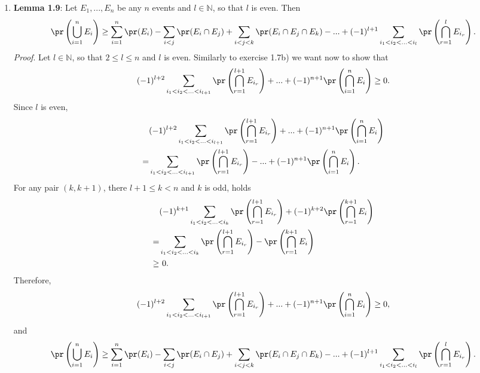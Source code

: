 \begin{enumerate}
  \item[(c)] \textbf{Lemma 1.9}: Let $E_1,...,E_n$ be any $n$ events and $l \in
  \mathbb{N}$, so that $l$ is even. Then
  \[
    \pr\left(\bigcup_{i=1}^n E_i\right)
    \geq \sum_{i=1}^n \pr(E_i) - \sum_{i<j}\pr(E_i \cap E_j) + \sum_{i<j<k}\pr(E_i \cap E_j \cap E_k) - ... + (-1)^{l+1} \sum_{i_1<i_2< ... <i_l} \pr\left(\bigcap_{r=1}^lE_{i_r}\right).
  \]
  \textit{Proof}. Let $l \in \mathbb{N}$, so that $2 \leq l \leq n$ and $l$ is even. Similarly to exercise 1.7b) we want now to show that
  \[
    (-1)^{l+2} \sum_{i_1<i_2< ... <i_{l+1}} \pr\left(\bigcap_{r=1}^{l+1} E_{i_r}\right)
    + ... + (-1)^{n+1} \pr\left(\bigcap_{i=1}^n E_{i}\right) \geq 0.
  \]
  Since $l$ is even,
  \begin{align*}
      &(-1)^{l+2} \sum_{i_1<i_2< ... <i_{l+1}} \pr\left(\bigcap_{r=1}^{l+1} E_{i_r}\right) + ... + (-1)^{n+1} \pr\left(\bigcap_{i=1}^n E_{i}\right) \\
    = &\sum_{i_1<i_2< ... <i_{l+1}} \pr\left(\bigcap_{r=1}^{l+1} E_{i_r}\right)
      - ... + (-1)^{n+1} \pr\left(\bigcap_{i=1}^n E_{i}\right).
  \end{align*}
  For any pair $(k,k+1)$, there $l+1 \leq k < n$ and $k$ is odd, holds
  \begin{align*}
    \   &(-1)^{k+1} \sum_{i_1<i_2< ... <i_{k}} \pr\left(\bigcap_{r=1}^{l+1} E_{i_r}\right) + (-1)^{k+2} \pr\left( \bigcap_{r=1}^{k+1} E_{i} \right) \\
    =   &\sum_{i_1<i_2< ... <i_k} \pr\left( \bigcap_{r=1}^{l+1} E_{i_r} \right) - \pr\left(\bigcap_{r=1}^{k+1} E_{i}\right) \\
    \geq &\ 0.
  \end{align*}
  Therefore,
  \[
    (-1)^{l+2} \sum_{i_1<i_2< ... <i_{l+1}} \pr\left(\bigcap_{r=1}^{l+1} E_{i_r}\right)
    + ... + (-1)^{n+1} \pr\left(\bigcap_{i=1}^n E_{i}\right) \geq 0,
  \]
  and
  \[
    \pr\left(\bigcup_{i=1}^n E_i\right)
    \geq \sum_{i=1}^n \pr(E_i) - \sum_{i<j}\pr(E_i \cap E_j) + \sum_{i<j<k}\pr(E_i \cap E_j \cap E_k) - ... + (-1)^{l+1} \sum_{i_1<i_2< ... <i_l} \pr\left(\bigcap_{r=1}^lE_{i_r}\right).
  \]

\end{enumerate}

